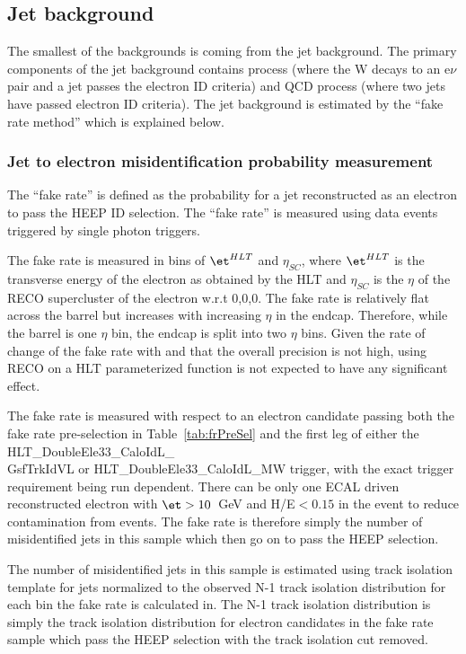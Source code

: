 \clearpage
\subsection{Jet background}
\label{FRsec}
The smallest of the backgrounds is coming from the jet background.
The primary components of the jet background contains \wjets process (where the W decays to an e$\nu$ pair and a jet passes the electron ID criteria) and QCD process (where two jets have passed electron ID criteria). The jet background is estimated by the ``fake rate method'' which is explained below.

\subsubsection{Jet to electron misidentification probability measurement}


The ``fake rate'' is defined as the probability for a jet reconstructed as an electron to pass the HEEP ID selection. The ``fake rate'' is measured using data events triggered by single photon triggers.

The fake rate is measured in bins of $\et^{HLT}$ and $\eta_{SC}$, where $\et^{HLT}$ is the transverse energy of the electron as obtained by the HLT and $\eta_{SC}$ is the $\eta$ of the RECO supercluster of the electron w.r.t 0,0,0. The fake rate is relatively flat across the barrel but increases with increasing $\eta$ in the endcap. Therefore, while the barrel is one $\eta$ bin, the endcap is split into two $\eta$ bins.
Given the rate of change of the fake rate with \et and that the overall precision is not high, using RECO \et on a HLT \et parameterized function is not expected to have any significant effect.

The fake rate is measured with respect to an electron candidate passing both the fake rate pre-selection in Table~\ref{tab:frPreSel} and the first leg of either the HLT\_DoubleEle33\_CaloIdL\_\\GsfTrkIdVL or HLT\_DoubleEle33\_CaloIdL\_MW trigger, with the exact trigger requirement being run dependent. There can be only one ECAL driven reconstructed electron with $\et>10$~GeV and H/E$<0.15$ in the event to reduce contamination from \zee events. The fake rate is therefore simply the number of misidentified jets in this sample which then go on to pass the HEEP selection.

The number of misidentified jets in this sample is estimated using track isolation template for jets normalized to the observed N-1 track isolation distribution for each bin the fake rate is calculated in. The N-1 track isolation distribution is simply the track isolation distribution for electron candidates in the fake rate sample which pass the HEEP selection with the track isolation cut removed.

